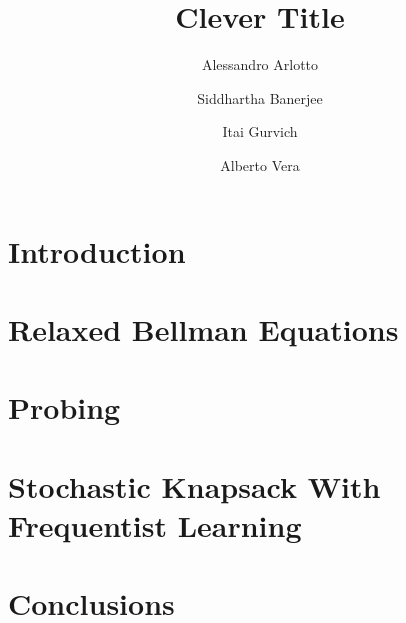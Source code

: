 \documentclass[format=sigconf, screen=true]{acmart}
\begin{document}
\title{Clever Title} 

\author{Alessandro Arlotto} 
\author{Siddhartha Banerjee}
\author{Itai Gurvich}
\author{Alberto Vera}



\begin{abstract}

\end{abstract}

\maketitle

\section{Introduction}



\section{Relaxed Bellman Equations}


\section{Probing}


\section{Stochastic Knapsack With Frequentist Learning}


\section{Conclusions}





\end{document}
